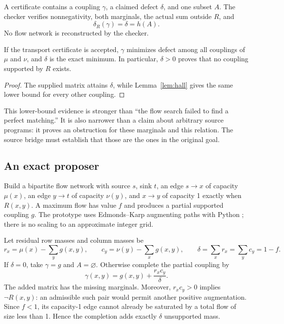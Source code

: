 A certificate contains a coupling $\gamma$, a claimed defect $\delta$, and one
subset $A$. The checker verifies nonnegativity, both marginals, the actual sum
outside $R$, and
\begin{equation}
 \delta_R(\gamma)=\delta=h(A).
 \label{eq:transport-dual}
\end{equation}
No flow network is reconstructed by the checker.

\begin{theorem}
\label{thm:transport}
If the transport certificate is accepted, $\gamma$ minimizes defect among all
couplings of $\mu$ and $\nu$, and $\delta$ is the exact minimum. In particular,
$\delta>0$ proves that no coupling supported by $R$ exists.
\end{theorem}
\begin{proof}
The supplied matrix attains $\delta$, while Lemma~\ref{lem:hall} gives the same
lower bound for every other coupling.
\end{proof}

This lower-bound evidence is stronger than ``the flow search failed to find a
perfect matching.'' It is also narrower than a claim about arbitrary source
programs: it proves an obstruction for these marginals and this relation. The
source bridge must establish that those are the ones in the original goal.

\subsection{An exact proposer}

Build a bipartite flow network with source $s$, sink $t$, an edge
$s\to x$ of capacity $\mu(x)$, an edge $y\to t$ of capacity $\nu(y)$, and
$x\to y$ of capacity 1 exactly when $R(x,y)$. A maximum flow has value $f$ and
produces a partial supported coupling $g$. The prototype uses Edmonds--Karp
augmenting paths with Python ; there is no scaling to an
approximate integer grid.

Let residual row masses and column masses be
\[
 r_x=\mu(x)-\sum_y g(x,y),\qquad
 c_y=\nu(y)-\sum_x g(x,y),\qquad
 \delta=\sum_xr_x=\sum_yc_y=1-f.
\]
If $\delta=0$, take $\gamma=g$ and $A=\varnothing$. Otherwise complete the
partial coupling by
\begin{equation}
 \gamma(x,y)=g(x,y)+\frac{r_xc_y}{\delta}.
 \label{eq:residual-coupling}
\end{equation}
The added matrix has the missing marginals. Moreover, $r_xc_y>0$ implies
$\neg R(x,y)$: an admissible such pair would permit another positive
augmentation. Since $f<1$, its capacity-1 edge cannot already be saturated by
a total flow of size less than 1. Hence the completion adds exactly $\delta$
unsupported mass.

